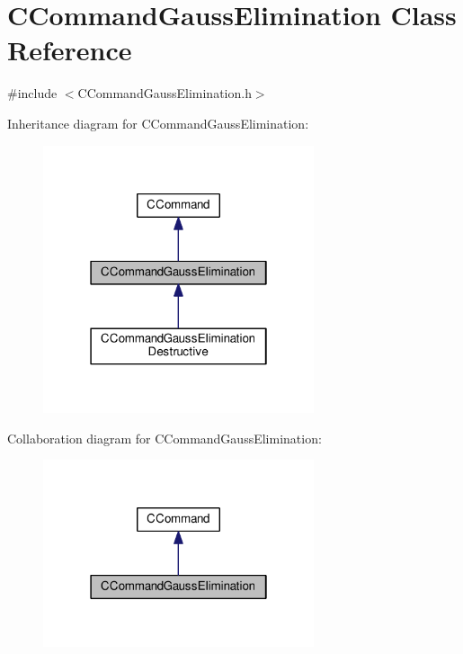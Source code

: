 \hypertarget{classCCommandGaussElimination}{}\section{C\+Command\+Gauss\+Elimination Class Reference}
\label{classCCommandGaussElimination}


{\ttfamily \#include $<$C\+Command\+Gauss\+Elimination.\+h$>$}



Inheritance diagram for C\+Command\+Gauss\+Elimination\+:
\nopagebreak
\begin{figure}[H]
\begin{center}
\leavevmode
\includegraphics[width=226pt]{classCCommandGaussElimination__inherit__graph}
\end{center}
\end{figure}


Collaboration diagram for C\+Command\+Gauss\+Elimination\+:\nopagebreak
\begin{figure}[H]
\begin{center}
\leavevmode
\includegraphics[width=226pt]{classCCommandGaussElimination__coll__graph}
\end{center}
\end{figure}
